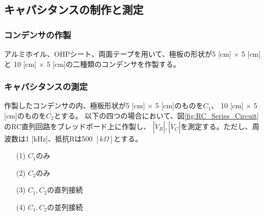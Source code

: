 \documentclass[dvipdfmx]{jsarticle}
\begin{document}
\subsection{キャパシタンスの制作と測定}
\subsubsection{コンデンサの作製}
アルミホイル、OHPシート、両面テープを用いて、極板の形状が5 [cm] $\times$ 5 [cm]と
10 [cm] $\times$ 5 [cm]の二種類のコンデンサを作製する。
\subsubsection{キャパシタンスの測定}
作製したコンデンサの内、極板形状が5 [cm] $\times$ 5 [cm]のものを$C_1$、
10 [cm] $\times$ 5 [cm]のものを$C_2$とする。
以下の四つの場合において、図\ref{fig:RC_Series_Circuit}のRC直列回路をブレッドボード上に作製し、
$|\dot V_R|, |\dot V_C|$を測定する。ただし、周波数は1 [kHz]、抵抗Rは500 $[k\Omega]$とする。
\begin{itemize}
  \item [(1)]$C_1$のみ
  \item [(2)]$C_2$のみ
  \item [(3)]$C_1, C_2$の直列接続
  \item [(4)]$C_1, C_2$の並列接続
\end{itemize}
\end{document}
